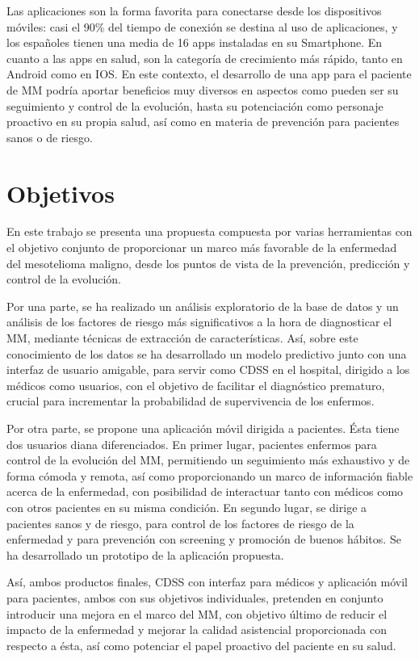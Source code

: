 \documentclass{article}
\begin{document}
Las aplicaciones son la forma favorita para conectarse desde los
dispositivos móviles: casi el 90\% del tiempo de conexión se destina al
uso de aplicaciones, y los españoles tienen una media de 16 apps
instaladas en su Smartphone. En cuanto a las apps en salud, son la
categoría de crecimiento más rápido, tanto en Android como en IOS. En
este contexto, el desarrollo de una app para el paciente de MM podría
aportar beneficios muy diversos en aspectos como pueden ser su
seguimiento y control de la evolución, hasta su potenciación como
personaje proactivo en su propia salud, así como en materia de
prevención para pacientes sanos o de riesgo.


\section{Objetivos}


En este trabajo se presenta una propuesta compuesta por varias
herramientas con el objetivo conjunto de proporcionar un marco más
favorable de la enfermedad del mesotelioma maligno, desde los puntos
de vista de la prevención, predicción y control de la evolución.

Por una parte, se ha realizado un análisis exploratorio de la base de
datos y un análisis de los factores de riesgo más significativos a la
hora de diagnosticar el MM, mediante técnicas de extracción de
características. Así, sobre este conocimiento de los datos se ha
desarrollado un modelo predictivo junto con una interfaz de usuario
amigable, para servir como CDSS en el hospital, dirigido a los médicos
como usuarios, con el objetivo de facilitar el diagnóstico prematuro,
crucial para incrementar la probabilidad de supervivencia de los
enfermos.

Por otra parte, se propone una aplicación móvil dirigida a pacientes.
Ésta tiene dos usuarios diana diferenciados. En primer lugar,
pacientes enfermos para control de la evolución del MM, permitiendo un
seguimiento más exhaustivo y de forma cómoda y remota, así como
proporcionando un marco de información fiable acerca de la enfermedad,
con posibilidad de interactuar tanto con médicos como con otros
pacientes en su misma condición. En segundo lugar, se dirige a
pacientes sanos y de riesgo, para control de los factores de riesgo de
la enfermedad y para prevención con screening y promoción de buenos
hábitos. Se ha desarrollado un prototipo de la aplicación propuesta.

Así, ambos productos finales, CDSS con interfaz para médicos y
aplicación móvil para pacientes, ambos con sus objetivos individuales,
pretenden en conjunto introducir una mejora en el marco del MM, con
objetivo último de reducir el impacto de la enfermedad y mejorar la
calidad asistencial proporcionada con respecto a ésta, así como
potenciar el papel proactivo del paciente en su salud.
\end{document}
